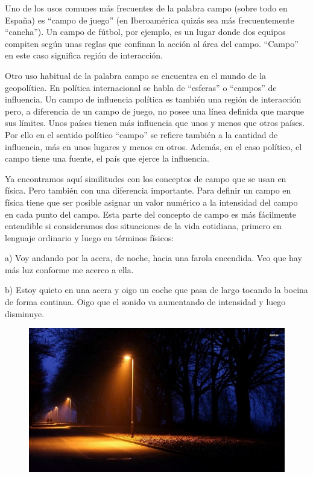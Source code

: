 Uno de los usos comunes más frecuentes de la palabra campo (sobre todo en España) es “campo de juego” (en Iberoamérica quizás sea más frecuentemente “cancha”). Un campo de fútbol, por ejemplo, es un lugar donde dos equipos compiten según unas reglas que confinan la acción al área del campo. “Campo” en este caso significa región de interacción.

Otro uso habitual de la palabra campo se encuentra en el mundo de la geopolítica. En política internacional se habla de “esferas” o “campos” de influencia. Un campo de influencia política es también una región de interacción pero, a diferencia de un campo de juego, no posee una línea definida que marque sus límites. Unos países tienen más influencia que unos y menos que otros países. Por ello en el sentido político “campo” se refiere también a la cantidad de influencia, más en unos lugares y menos en otros. Además, en el caso político, el campo tiene una fuente, el país que ejerce la influencia.

Ya encontramos aquí similitudes con los conceptos de campo que se usan en física. Pero también con una diferencia importante. Para definir un campo en física tiene que ser posible asignar un valor numérico a la intensidad del campo en cada punto del campo. Esta parte del concepto de campo es más fácilmente entendible si consideramos dos situaciones de la vida cotidiana, primero en lenguaje ordinario y luego en términos físicos:

a) Voy andando por la acera, de noche, hacia una farola encendida. Veo que hay más luz conforme me acerco a ella.

b) Estoy quieto en una acera y oigo un coche que pasa de largo tocando la bocina de forma continua. Oigo que el sonido va aumentando de intensidad y luego disminuye.

	\begin{figure}[H]
	\centering
	\includegraphics[width=1\textwidth]{imagenes/imagenes10/ExperientiaDocet02.png}
	\end{figure}


